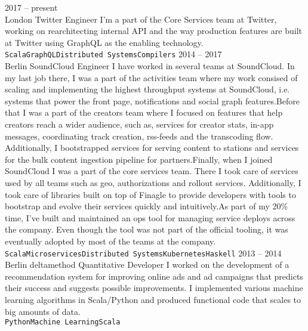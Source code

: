 \documentclass[9pt]{developercv} %
\begin{document}
\begin{entrylist}
	\entry
		{2017 -- present\\\footnotesize{London}}
		{Twitter}
		{Engineer}
		{I'm a part of the Core Services team at Twitter, working on rearchitecting internal API and the way production features are built at Twitter using GraphQL as the enabling technology.\\ \texttt{Scala}\slashsep\texttt{GraphQL}\slashsep\texttt{Distributed Systems}\slashsep\texttt{Compilers}}
	\entry
		{2014 -- 2017\\\footnotesize{Berlin}}
		{SoundCloud}
		{Engineer}
		{I have worked in several teams at SoundCloud. In my last job there, I was a part of the activities team where my work consised of scaling and implementing the highest throughput systems at SoundCloud, i.e. systems that power the front page, notifications and social graph features.\newline\newline Before that I was a part of the creators team where I focused on features that help creators reach a wider audience, such as, services for creator stats, in-app messages, coordinating track creation, rss-feeds and the transcoding flow. Additionally, I bootstrapped services for serving content to stations and services for the bulk content ingestion pipeline for partners.\newline\newline Finally, when I joined SoundCloud I was a part of the core services team. There I took care of services used by all teams such as geo, authorizations and rollout services. Additionally, I took care of libraries built on top of Finagle to provide developers with tools to bootstrap and evolve their services quickly and intuitively.\newline\newline As part of my 20\% time, I've built and maintained an ops tool for managing service deploys across the company. Even though the tool was not part of the official tooling, it was eventually adopted by most of the teams at the company.\\ \texttt{Scala}\slashsep\texttt{Microservices}\slashsep\texttt{Distributed Systems}\slashsep\texttt{Kubernetes}\slashsep\texttt{Haskell}}
	\entry
		{2013 -- 2014\\\footnotesize{Berlin}}
		{deltamethod}
		{Quantitative Developer}
		{I worked on the development of a recommendation system for improving online ads and ad campaigns that predicts their success and suggests possible improvements. I implemented various machine learning algorithms in Scala/Python and produced functional code that scales to big amounts of data.\\ \texttt{Python}\slashsep\texttt{Machine Learning}\slashsep\texttt{Scala}}

\end{entrylist}
\end{document}
